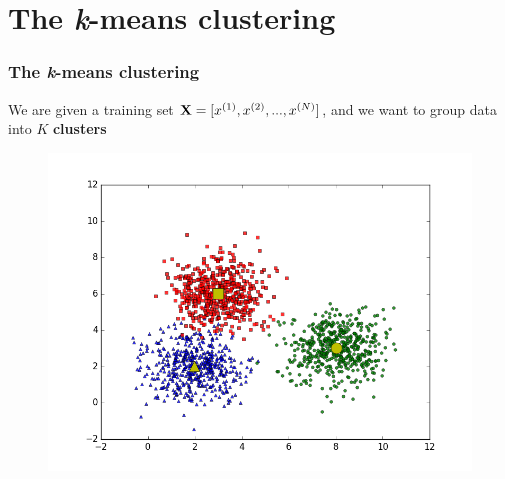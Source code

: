 \documentclass{beamer}
\begin{document}
\section{The {\it k}-means clustering}
\begin{frame}
\frametitle{The {\it k}-means clustering}
We are given a training set $ {\bf X} = [x^{(1)}, x^{(2)},..., x^{(N)}]$, and we want to group data into $K$ {\bf clusters}
\begin{figure}
	\includegraphics[scale=0.3]{figs/figure_2.png}
\end{figure}
\end{frame}
\end{document}
